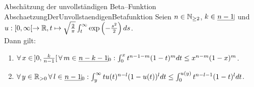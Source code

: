 \begin{lemma}{Abschätzung der unvollständigen Beta--Funktion}
             {AbschaetzungDerUnvollstaendigenBetafunktion}
Seien $n \in \mathbb{N}_{\ge 2}$, $k \in \haken{n-1}$ und $u:[0,\infty[ \rightarrow \mathbb{R},
t \mapsto\sqrt{\frac 2\pi} \int_t^\infty \exp\left(- \frac{s^2}2 \right)ds$.\\
Dann gilt:
\begin{enumerate}[(1)]
	\item \label{AbschaetzungDerUnvollstaendigenBetafunktion1}
	$\forall\, x \in \!\ ]0, \frac k {n-1}[\, \forall\, m \in \haken{n-k-1}_0:
	\int_0^x t^{n-1-m}(1-t)^m dt \le x^{n-m}(1-x)^m$.
	\item \label{AbschaetzungDerUnvollstaendigenBetafunktion2}
	$\forall\, y \in \R_{>0}\, \forall\, l \in \haken {n-1}_0:
	\int_{y}^\infty tu(t)^{n-l}(1-u(t))^l dt \le
	\int_0^{u(y)}t^{n-l-1}(1-t)^l dt$.
\end{enumerate}
\end{lemma}
